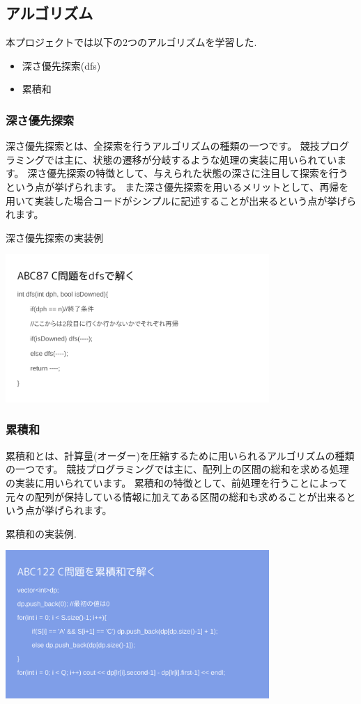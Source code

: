\documentclass[11pt,a4paper]{jsarticle}
\begin{document}
\subsection{アルゴリズム}
本プロジェクトでは以下の2つのアルゴリズムを学習した.
\begin{itemize}
    \item 深さ優先探索(dfs)
    \item 累積和
\end{itemize}

\subsubsection{深さ優先探索}
深さ優先探索とは、全探索を行うアルゴリズムの種類の一つです。
競技プログラミングでは主に、状態の遷移が分岐するような処理の実装に用いられています。
深さ優先探索の特徴として、与えられた状態の深さに注目して探索を行うという点が挙げられます。
また深さ優先探索を用いるメリットとして、再帰を用いて実装した場合コードがシンプルに記述することが出来るという点が挙げられます。

深さ優先探索の実装例

\includegraphics[width=10cm]{dfs.png}

\subsubsection{累積和}
累積和とは、計算量(オーダー)を圧縮するために用いられるアルゴリズムの種類の一つです。
競技プログラミングでは主に、配列上の区間の総和を求める処理の実装に用いられています。
累積和の特徴として、前処理を行うことによって元々の配列が保持している情報に加えてある区間の総和も求めることが出来るという点が挙げられます。

累積和の実装例.

\includegraphics[width=10cm]{ruisekiwa.png}
\end{document}
